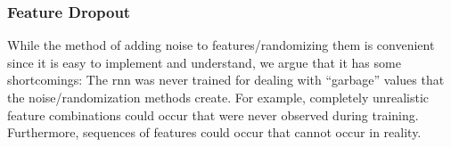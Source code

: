 \documentclass[conference]{IEEEtran}
\begin{document}
\subsubsection{Feature Dropout}
While the method of adding noise to features/randomizing them is convenient since it is easy to implement and understand, we argue that it has some shortcomings: 
The \gls{rnn} was never trained for dealing with ``garbage'' values that the noise/randomization methods create. For example, completely unrealistic feature combinations could occur that were never observed during training. Furthermore, sequences of features could occur that cannot occur in reality. 
 
\end{document}
